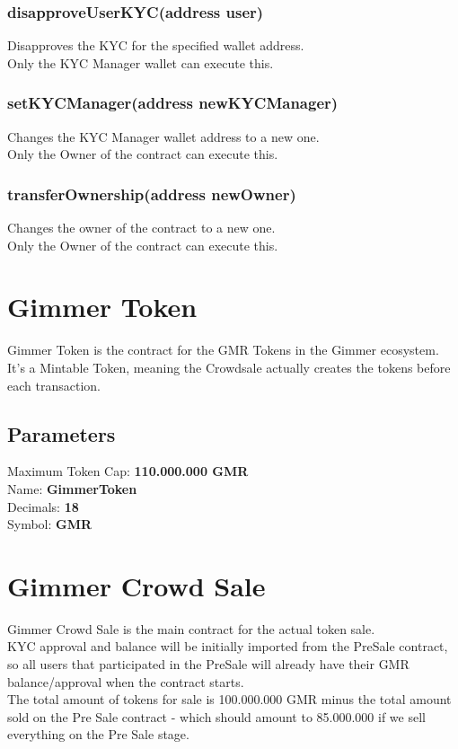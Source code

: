 \documentclass[11pt]{article} %
\begin{document}
\subsubsection{disapproveUserKYC(address user)}
Disapproves the KYC for the specified wallet address.\\
Only the KYC Manager wallet can execute this.

\subsubsection{setKYCManager(address newKYCManager)}
Changes the KYC Manager wallet address to a new one.\\
Only the Owner of the contract can execute this.

\subsubsection{transferOwnership(address newOwner)}
Changes the owner of the contract to a new one.\\
Only the Owner of the contract can execute this.

\section{Gimmer Token}
Gimmer Token is the contract for the GMR Tokens in the Gimmer ecosystem.\\
It's a Mintable Token, meaning the Crowdsale actually creates the tokens before each transaction.\\

\subsection{Parameters}
Maximum Token Cap: \textbf{110.000.000 GMR}\\
Name: \textbf{GimmerToken}\\
Decimals: \textbf{18}\\
Symbol: \textbf{GMR}

\section{Gimmer Crowd Sale}
Gimmer Crowd Sale is the main contract for the actual token sale.\\
KYC approval and balance will be initially imported from the PreSale contract, so all users that participated in the PreSale will already have their GMR balance/approval when the contract starts.\\
The total amount of tokens for sale is 100.000.000 GMR minus the total amount sold on the Pre Sale contract - which should amount to 85.000.000 if we sell everything on the Pre Sale stage.
\end{document}
